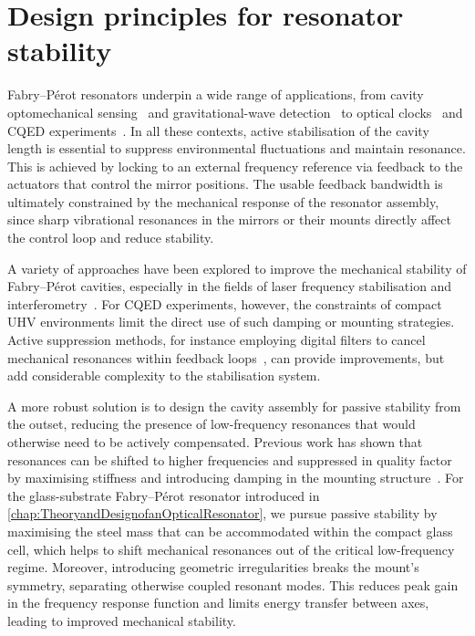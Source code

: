 \documentclass[../Thesis-IJspeert.tex]{subfiles}
\begin{document}
\section{Design principles for resonator stability}
\label{subsec:mechanicalstab}
Fabry--Pérot resonators underpin a wide range of applications, from cavity optomechanical sensing~\cite{Aspelmeyer2014} and gravitational-wave detection~\cite{Abbott2016} to optical clocks~\cite{Hinkley2013} and CQED experiments~\cite{Mabuchi2002,Birnbaum2005,Steiner2013}. In all these contexts, active stabilisation of the cavity length is essential to suppress environmental fluctuations and maintain resonance. This is achieved by locking to an external frequency reference via feedback to the actuators that control the mirror positions. The usable feedback bandwidth is ultimately constrained by the mechanical response of the resonator assembly, since sharp vibrational resonances in the mirrors or their mounts directly affect the control loop and reduce stability.

A variety of approaches have been explored to improve the mechanical stability of Fabry--Pérot cavities, especially in the fields of laser frequency stabilisation and interferometry~\cite{Notcutt2005,Briles2010,Sinclair2015}. For CQED experiments, however, the constraints of compact UHV environments limit the direct use of such damping or mounting strategies. Active suppression methods, for instance employing digital filters to cancel mechanical resonances within feedback loops~\cite{Ryou2017}, can provide improvements, but add considerable complexity to the stabilisation system.

A more robust solution is to design the cavity assembly for passive stability from the outset, reducing the presence of low-frequency resonances that would otherwise need to be actively compensated. Previous work has shown that resonances can be shifted to higher frequencies and suppressed in quality factor by maximising stiffness and introducing damping in the mounting structure~\cite{Briles2010, Sinclair2015}. For the glass-substrate Fabry--Pérot resonator introduced in \autoref{chap:TheoryandDesignofanOpticalResonator}, we pursue passive stability by maximising the steel mass that can be accommodated within the compact glass cell, which helps to shift mechanical resonances out of the critical low-frequency regime. Moreover, introducing geometric irregularities breaks the mount's symmetry, separating otherwise coupled resonant modes. This reduces peak gain in the frequency response function and limits energy transfer between axes, leading to improved mechanical stability.
\end{document}
